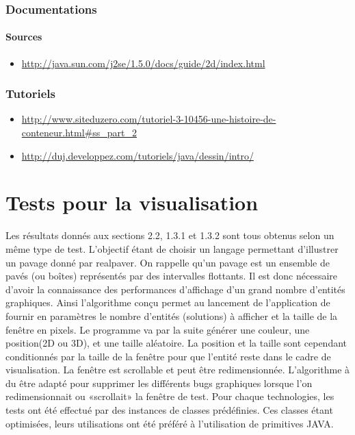 \documentclass{article}
\begin{document}
\subsubsection{Documentations}
\paragraph{Sources}
\begin{itemize}
\item 
\url{http://java.sun.com/j2se/1.5.0/docs/guide/2d/index.html}                                                        
\end{itemize}
\subsubsection{Tutoriels}
\begin{itemize}
\item 
\url{http://www.siteduzero.com/tutoriel-3-10456-une-histoire-de-conteneur.html#ss_part_2}
\item 
\url{http://duj.developpez.com/tutoriels/java/dessin/intro/}
\end{itemize}



\section{Tests pour la visualisation}
Les résultats donnés aux sections 2.2, 1.3.1 et 1.3.2 sont tous obtenus selon un même type de test.
L'objectif étant de choisir un langage permettant d'illustrer un pavage donné par realpaver.
On rappelle qu'un pavage est un ensemble de pavés (ou boîtes) représentés par des intervalles flottants.
Il est donc nécessaire d'avoir la connaissance des performances d'affichage d'un grand nombre d'entités graphiques. 
Ainsi l'algorithme conçu permet au lancement de l'application de fournir en paramètres le nombre d'entités (solutions) à afficher et la taille de la fenêtre en pixels.
Le programme va par la suite générer une couleur, une position(2D ou 3D), et une taille aléatoire.
La position et la taille sont cependant conditionnés par la taille de la fenêtre pour que l'entité reste dans le cadre de visualisation. 
La fenêtre est  scrollable et peut être redimensionnée.
L'algorithme à du être adapté pour supprimer les différents bugs graphiques lorsque l'on redimensionnait ou «scrollait» la fenêtre de test.
Pour chaque technologies, les tests ont été effectué par des instances de classes prédéfinies. 
Ces classes étant optimisées, leurs utilisations ont été préféré à l'utilisation de primitives JAVA. 
\end{document}
